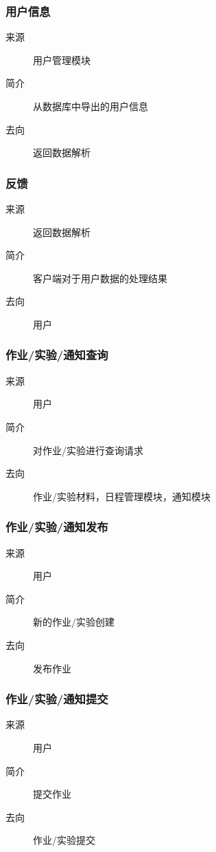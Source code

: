 \subsubsection{用户信息}
\begin{description}
  \item[来源]用户管理模块
  \item[简介]从数据库中导出的用户信息
  \item[去向]返回数据解析
\end{description}

\subsubsection{反馈}
\begin{description}
  \item[来源]返回数据解析
  \item[简介]客户端对于用户数据的处理结果
  \item[去向]用户
\end{description}

\subsubsection{作业/实验/通知查询}
\begin{description}
  \item[来源]用户
  \item[简介]对作业/实验进行查询请求
  \item[去向]作业/实验材料，日程管理模块，通知模块
\end{description}

\subsubsection{作业/实验/通知发布}
\begin{description}
  \item[来源]用户
  \item[简介]新的作业/实验创建
  \item[去向]发布作业
\end{description}

\subsubsection{作业/实验/通知提交}
\begin{description}
  \item[来源]用户
  \item[简介]提交作业
  \item[去向]作业/实验提交
\end{description}

